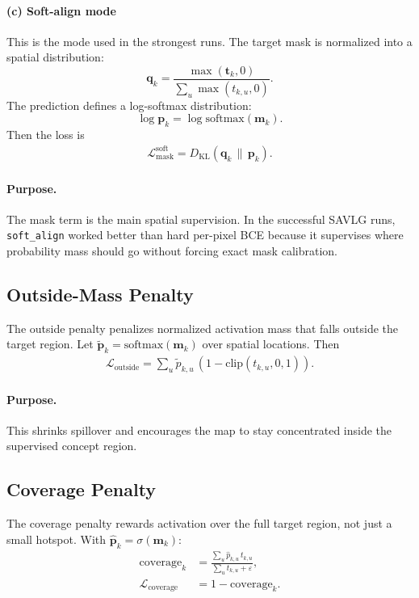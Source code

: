 \documentclass[11pt]{article}
\begin{document}
\paragraph{(c) Soft-align mode}
This is the mode used in the strongest runs. The target mask is normalized into a
spatial distribution:
\[
\bm{q}_k = \frac{\max(\bm{t}_k, 0)}{\sum_u \max(t_{k,u},0)}.
\]
The prediction defines a log-softmax distribution:
\[
\log \bm{p}_k = \log \mathrm{softmax}(\bm{m}_k).
\]
Then the loss is
\begin{align}
\mathcal{L}_{\mathrm{mask}}^{\mathrm{soft}}
=
D_{\mathrm{KL}}(\bm{q}_k \,\|\, \bm{p}_k).
\end{align}

\paragraph{Purpose.}
The mask term is the main spatial supervision. In the successful SAVLG runs,
\texttt{soft\_align} worked better than hard per-pixel BCE because it supervises
where probability mass should go without forcing exact mask calibration.

\subsection{Outside-Mass Penalty}
The outside penalty penalizes normalized activation mass that falls outside the
target region. Let $\tilde{\bm{p}}_k = \mathrm{softmax}(\bm{m}_k)$ over spatial
locations. Then
\begin{align}
\mathcal{L}_{\mathrm{outside}}
=
\sum_{u}
\tilde{p}_{k,u}
\,
(1 - \mathrm{clip}(t_{k,u}, 0, 1)).
\end{align}

\paragraph{Purpose.}
This shrinks spillover and encourages the map to stay concentrated inside the
supervised concept region.

\subsection{Coverage Penalty}
The coverage penalty rewards activation over the full target region, not just a
small hotspot. With $\hat{\bm{p}}_k = \sigma(\bm{m}_k)$:
\begin{align}
\mathrm{coverage}_k
&=
\frac{
\sum_{u} \hat{p}_{k,u} \, t_{k,u}
}{
\sum_{u} t_{k,u} + \varepsilon
}, \\
\mathcal{L}_{\mathrm{coverage}}
&=
1 - \mathrm{coverage}_k.
\end{align}
\end{document}
